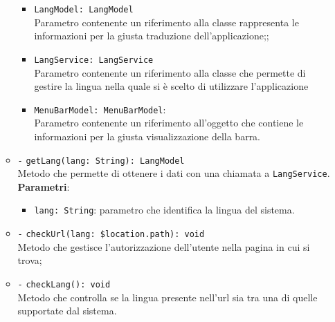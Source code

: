 \begin{itemize}
\begin{itemize}
\begin{itemize}
			\item \texttt{LangModel: LangModel} \\
			Parametro contenente un riferimento alla classe rappresenta le informazioni per la giusta traduzione dell'applicazione;;
			\item \texttt{LangService: LangService} \\
			Parametro contenente un riferimento alla classe che permette di gestire la lingua nella quale si è scelto di utilizzare l'applicazione
			\item \texttt{MenuBarModel: MenuBarModel}: \\
			Parametro contenente un riferimento all'oggetto che contiene le informazioni per la giusta visualizzazione della barra.
		\end{itemize}
		\item \texttt{-} \texttt{getLang(lang: String): LangModel} \\ Metodo che permette di ottenere i dati con una chiamata a \texttt{LangService}.\\
		\textbf{Parametri}:
		\begin{itemize}
			\item \texttt{lang: String}: parametro che identifica la lingua del sistema.
		\end{itemize}
		\item \texttt{-} \texttt{checkUrl(lang: \$location.path): void} \\ Metodo che gestisce l'autorizzazione dell'utente nella pagina in cui si trova;
		\item \texttt{-} \texttt{checkLang(): void} \\ Metodo che controlla se la lingua presente nell'url sia tra una di quelle supportate dal sistema.
	\end{itemize}
\end{itemize}

